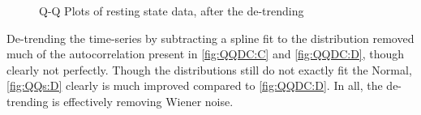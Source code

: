 \begin{figure}
\centering
{}
\caption{Q-Q Plots of resting state data, after the de-trending}
\label{fig:QQSpline}
\end{figure}

De-trending the time-series by subtracting a spline fit to the distribution
removed much of the autocorrelation present in \autoref{fig:QQDC:C} and \autoref{fig:QQDC:D},
though clearly not perfectly. Though the distributions still do not exactly fit
the Normal, \autoref{fig:QQs:D} clearly is much improved compared to \autoref{fig:QQDC:D}.
In all, the de-trending is effectively removing Wiener noise. 

